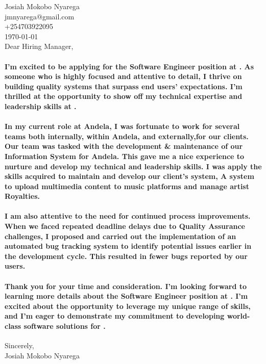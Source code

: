 \documentclass{article}
\begin{document}
\begin{flushleft}
Josiah Mokobo Nyarega\\
jmnyarega@gmail.com\\
+254703922095\\
\today\\
\vspace*{1\baselineskip}
Dear Hiring Manager,
\end{flushleft}

\paragraph{I'm excited to be applying for the Software Engineer position at . As someone who is highly focused and attentive to detail, I thrive on building quality systems that surpass end users' expectations. I'm thrilled at the opportunity to show off my technical expertise and leadership skills at .}

\paragraph{In my current role at Andela, I was fortunate to work for several teams both internally, within Andela, and externally,for our clients. Our team was tasked with the development \& maintenance of our Information System for Andela. This gave me a nice experience to nurture and develop my technical and leadership skills. I was apply the skills acquired to maintain and develop our client's system, A system to upload multimedia content to music platforms and manage artist Royalties.}

\paragraph{I am also attentive to the need for continued process improvements. When we faced repeated deadline delays due to Quality Assurance challenges, I proposed and carried out the implementation of an automated bug tracking system to identify potential issues earlier in the development cycle. This resulted in fewer bugs reported by our users.}

\paragraph{Thank you for your time and consideration. I'm looking forward to learning more details about the Software Engineer position at . I'm excited about the opportunity to leverage my unique range of skills, and I'm eager to demonstrate my commitment to developing world-class software solutions for .}

\begin{flushleft}
Sincerely,\\
Josiah Mokobo Nyarega\\
\end{flushleft}
\end{document}

